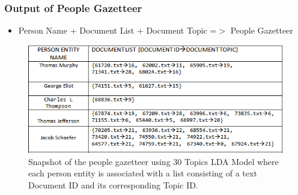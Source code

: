 \documentclass{beamer}
\begin{document}
\begin{frame}
\frametitle{Output of People Gazetteer}
\begin{itemize}
\item
Person Name + Document List + Document Topic =$>$ People Gazetteer
\end{itemize}
\begin{figure}[ht]
\begin{center}
\includegraphics[scale=0.7]{images/gaz2.png}
\caption{Snapshot of the people gazetteer using 30 Topics LDA Model where each person entity is associated with a list consisting of a text Document ID and its corresponding Topic ID.}
\end{center}
\end{figure}
\end{frame}
\end{document}

